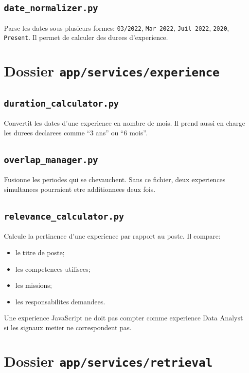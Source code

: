 \documentclass[12pt,a4paper]{article}
\begin{document}
\subsection{\texttt{date\_normalizer.py}}

Parse les dates sous plusieurs formes: \texttt{03/2022}, \texttt{Mar 2022}, \texttt{Juil 2022}, \texttt{2020}, \texttt{Present}. Il permet de calculer des durees d'experience.

\section{Dossier \texttt{app/services/experience}}

\subsection{\texttt{duration\_calculator.py}}

Convertit les dates d'une experience en nombre de mois. Il prend aussi en charge les durees declarees comme ``3 ans'' ou ``6 mois''.

\subsection{\texttt{overlap\_manager.py}}

Fusionne les periodes qui se chevauchent. Sans ce fichier, deux experiences simultanees pourraient etre additionnees deux fois.

\subsection{\texttt{relevance\_calculator.py}}

Calcule la pertinence d'une experience par rapport au poste. Il compare:

\begin{itemize}
  \item le titre de poste;
  \item les competences utilisees;
  \item les missions;
  \item les responsabilites demandees.
\end{itemize}

Une experience JavaScript ne doit pas compter comme experience Data Analyst si les signaux metier ne correspondent pas.

\section{Dossier \texttt{app/services/retrieval}}
\end{document}

